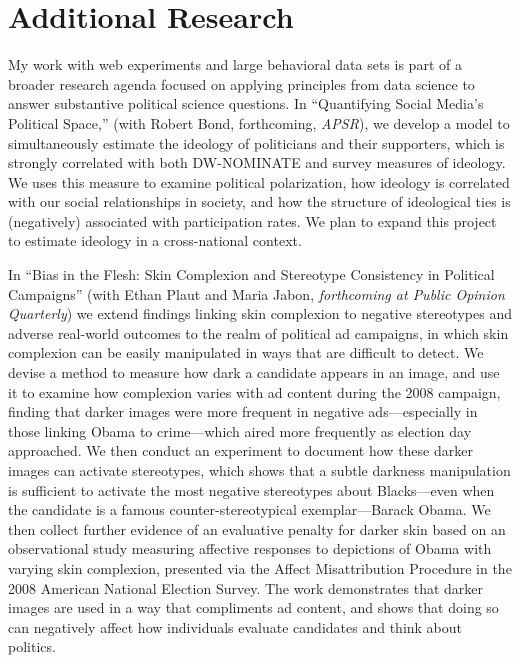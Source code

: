 \documentclass[12pt]{article}
\begin{document}
\section*{Additional Research}
My work with web experiments and large behavioral data sets is part of a broader research agenda focused on applying principles from data science to answer substantive political science questions.  In ``Quantifying Social Media's Political Space,'' (with Robert Bond, forthcoming, \emph{APSR}), we develop a model to simultaneously estimate the ideology of politicians and their supporters, which is strongly correlated with both DW-NOMINATE and survey measures of ideology.  We uses this measure to examine political polarization, how ideology is correlated with our social relationships in society, and how the structure of ideological ties is (negatively) associated with participation rates.  We plan to expand this project to estimate ideology in a cross-national context.  

In ``Bias in the Flesh: Skin Complexion and Stereotype Consistency in Political Campaigns'' (with Ethan Plaut and Maria Jabon, \emph{forthcoming at Public Opinion Quarterly}) we extend findings linking skin complexion to negative stereotypes and adverse real-world outcomes to the realm of political ad campaigns, in which skin complexion can be easily manipulated in ways that are difficult to detect.  We devise a method to measure how dark a candidate appears in an image, and use it to examine how complexion varies with ad content during the 2008 campaign, finding that darker images were more frequent in negative ads---especially in those linking Obama to crime---which aired more frequently as election day approached.  We then conduct an experiment to document how these darker images can activate stereotypes, which shows that a subtle darkness manipulation is sufficient to activate the most negative stereotypes about Blacks---even when the candidate is a famous counter-stereotypical exemplar---Barack Obama.  We then collect further evidence of an evaluative penalty for darker skin based on an observational study measuring affective responses to depictions of Obama with varying skin complexion, presented via the Affect Misattribution Procedure in the 2008 American National Election Survey.  The work demonstrates that darker images are used in a way that compliments ad content, and shows that doing so can negatively affect how individuals evaluate candidates and think about politics.
\end{document}
